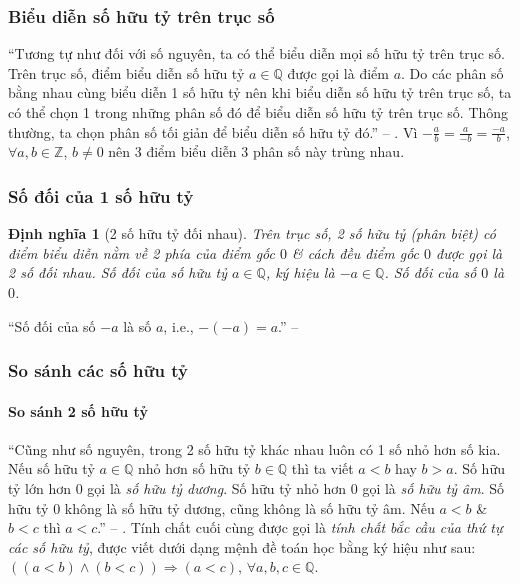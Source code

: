 \documentclass{article}
\numberwithin{equation}{section}
\newtheorem{dinhnghia}{Định nghĩa}[section]
\begin{document}
\subsubsection{Biểu diễn số hữu tỷ trên trục số}
``Tương tự như đối với số nguyên, ta có thể biểu diễn mọi số hữu tỷ trên trục số. Trên trục số, điểm biểu diễn số hữu tỷ $a\in\mathbb{Q}$ được gọi là điểm $a$. Do các phân số bằng nhau cùng biểu diễn 1 số hữu tỷ nên khi biểu diễn số hữu tỷ trên trục số, ta có thể chọn 1 trong những phân số đó để biểu diễn số hữu tỷ trên trục số. Thông thường, ta chọn phân số tối giản để biểu diễn số hữu tỷ đó.'' -- \cite[p. 6]{SGK_Toan_7_Canh_Dieu_tap_1}. Vì $-\frac{a}{b} = \frac{a}{-b} = \frac{-a}{b}$, $\forall a,b\in\mathbb{Z}$, $b\ne 0$ nên 3 điểm biểu diễn 3 phân số này trùng nhau.

\subsubsection{Số đối của 1 số hữu tỷ}

\begin{dinhnghia}[2 số hữu tỷ đối nhau]
	Trên trục số, 2 số hữu tỷ (phân biệt) có điểm biểu diễn nằm về 2 phía của điểm gốc $0$ \& cách đều điểm gốc $0$ được gọi là \emph{2 số đối nhau}. Số đối của số hữu tỷ $a\in\mathbb{Q}$, ký hiệu là $-a\in\mathbb{Q}$. Số đối của số $0$ là $0$.
\end{dinhnghia}
``Số đối của số $-a$ là số $a$, i.e., $-(-a) = a$.'' -- \cite[p. 8]{SGK_Toan_7_Canh_Dieu_tap_1}

\subsubsection{So sánh các số hữu tỷ}

\paragraph{So sánh 2 số hữu tỷ}
``Cũng như số nguyên, trong 2 số hữu tỷ khác nhau luôn có 1 số nhỏ hơn số kia. Nếu số hữu tỷ $a\in\mathbb{Q}$ nhỏ hơn số hữu tỷ $b\in\mathbb{Q}$ thì ta viết $a < b$ hay $b > a$. Số hữu tỷ lớn hơn $0$ gọi là \emph{số hữu tỷ dương}. Số hữu tỷ nhỏ hơn $0$ gọi là \emph{số hữu tỷ âm}. Số hữu tỷ $0$ không là số hữu tỷ dương, cũng không là số hữu tỷ âm. Nếu $a < b$ \& $b < c$ thì $a < c$.'' -- \cite[p. 8]{SGK_Toan_7_Canh_Dieu_tap_1}. Tính chất cuối cùng được gọi là \textit{tính chất bắc cầu của thứ tự các số hữu tỷ}, được viết dưới dạng mệnh đề toán học bằng ký hiệu như sau: $((a < b)\land(b < c))\Rightarrow(a < c)$, $\forall a,b,c\in\mathbb{Q}$.
\end{document}
